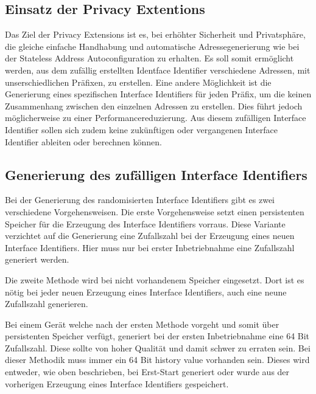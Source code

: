 \documentclass[a4paper, 12pt]{scrartcl}
\begin{document}
\subsection{Einsatz der Privacy Extentions}
Das Ziel der Privacy Extensions ist es, bei erhöhter Sicherheit und Privatsphäre, die gleiche einfache Handhabung und automatische Adressegenerierung wie bei der Stateless Address Autoconfiguration zu erhalten.
Es soll somit ermöglicht werden, aus dem zufällig erstellten Identface Identifier verschiedene Adressen, mit unserschiedlichen Präfixen, zu erstellen.
Eine andere Möglichkeit ist die Generierung eines spezifischen Interface Identifiers für jeden Präfix, um die keinen Zusammenhang zwischen den einzelnen Adressen zu erstellen.
Dies führt jedoch möglicherweise zu einer Performancereduzierung.
Aus diesem zufälligen Interface Identifier sollen sich zudem keine zukünftigen oder vergangenen Interface Identifier ableiten oder berechnen können.


\subsection{Generierung des zufälligen Interface Identifiers}
Bei der Generierung des randomisierten Interface Identifiers gibt es zwei verschiedene Vorgehensweisen.
Die erste Vorgehensweise setzt einen persistenten Speicher für die Erzeugung des Interface Identifiers vorraus.
Diese Variante verzichtet auf die Generierung eine Zufallszahl bei der Erzeugung eines neuen Interface Identifiers.
Hier muss nur bei erster Inbetriebnahme eine Zufallszahl generiert werden.

Die zweite Methode wird bei nicht vorhandenem Speicher eingesetzt. Dort ist es nötig bei jeder neuen Erzeugung eines Interface Identifiers, auch eine neune Zufallszahl generieren.

Bei einem Gerät welche nach der ersten Methode vorgeht und somit über persistenten Speicher verfügt, generiert bei der ersten Inbetriebnahme eine 64 Bit Zufallszahl. 
Diese sollte von hoher Qualität und damit schwer zu erraten sein. 
Bei dieser Methodik muss immer ein 64 Bit history value vorhanden sein. Dieses wird entweder, wie oben beschrieben, bei Erst-Start generiert oder wurde aus der vorherigen Erzeugung eines Interface Identifiers gespeichert.
\end{document}

